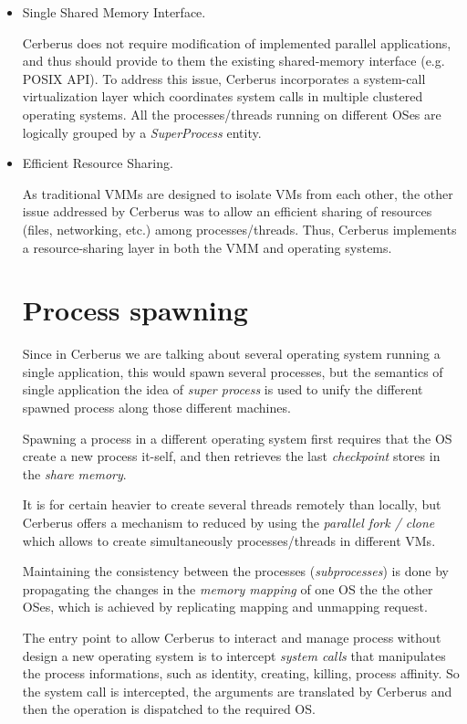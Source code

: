 \documentclass[journal]{IEEEtran}
\begin{document}
\begin{itemize}
  \item Single Shared Memory Interface.

    Cerberus does not require modification of implemented parallel
    applications, and thus should provide to them the existing
    shared-memory interface (e.g. POSIX API). To address this issue,
    Cerberus incorporates a system-call virtualization layer which
    coordinates system calls in multiple clustered operating systems.
    All the processes/threads running on different OSes are logically
    grouped by a \emph{SuperProcess} entity.

  \item Efficient Resource Sharing.

   As traditional VMMs are designed to isolate VMs from each other, the
   other issue addressed by Cerberus was to allow an efficient sharing
   of resources (files, networking, etc.) among processes/threads. Thus,
   Cerberus implements a resource-sharing layer in both the VMM and
   operating systems.

	\section{Process spawning} 
	
	Since in Cerberus we are talking about several operating system running a single application, this would spawn several processes, but the semantics of single application the idea of \emph{super process} is used to unify the different spawned process along those different machines.
	
	Spawning a process in a different operating system first requires that the OS create a new process it-self, and then retrieves the last \emph{checkpoint} stores in the \emph{share memory}. 
	
	It is for certain heavier to create several threads remotely than locally, but Cerberus offers a mechanism to reduced by using the \emph{parallel fork / clone} which allows to create simultaneously processes/threads in different VMs.	
	
	Maintaining the consistency between the processes (\emph{subprocesses}) is done by propagating the changes in the \emph{memory mapping} of one OS the the other OSes, which is achieved by replicating mapping and unmapping request.
	
	The entry point to allow Cerberus to interact and manage process without design a new operating system is to intercept \textit{system calls} that manipulates the process informations, such as identity, creating, killing, process affinity. So the system call is intercepted, the arguments are translated by Cerberus and then the operation is dispatched to the required OS. %
	

\end{itemize}
\end{document}
